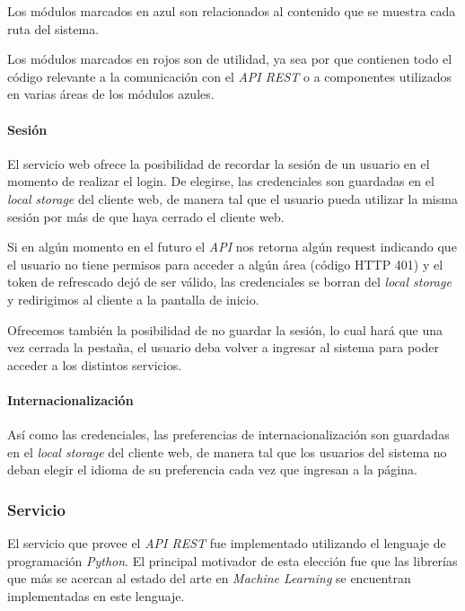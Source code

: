 \documentclass[12pt,a4paper,]{scrartcl}
\let\oldparagraph\paragraph
\renewcommand{\paragraph}[1]{\oldparagraph{#1}\mbox{}}
\begin{document}
Los módulos marcados en azul son relacionados al contenido que se muestra cada ruta del sistema.

Los módulos marcados en rojos son de utilidad, ya sea por que contienen todo el código relevante a la comunicación con el \emph{API REST} o a componentes utilizados en varias áreas de los módulos azules.

\hypertarget{sesiuxf3n}{%
\paragraph{Sesión}\label{sesiuxf3n}}

El servicio web ofrece la posibilidad de recordar la sesión de un usuario en el momento de realizar el login. De elegirse, las credenciales son guardadas en el \emph{local storage} del cliente web, de manera tal que el usuario pueda utilizar la misma sesión por más de que haya cerrado el cliente web.

Si en algún momento en el futuro el \emph{API} nos retorna algún request indicando que el usuario no tiene permisos para acceder a algún área (código HTTP 401) y el token de refrescado dejó de ser válido, las credenciales se borran del \emph{local storage} y redirigimos al cliente a la pantalla de inicio.

Ofrecemos también la posibilidad de no guardar la sesión, lo cual hará que una vez cerrada la pestaña, el usuario deba volver a ingresar al sistema para poder acceder a los distintos servicios.

\hypertarget{internacionalizaciuxf3n}{%
\paragraph{Internacionalización}\label{internacionalizaciuxf3n}}

Así como las credenciales, las preferencias de internacionalización son guardadas en el \emph{local storage} del cliente web, de manera tal que los usuarios del sistema no deban elegir el idioma de su preferencia cada vez que ingresan a la página.

\hypertarget{servicio-1}{%
\subsubsection{Servicio}\label{servicio-1}}

El servicio que provee el \emph{API REST} fue implementado utilizando el lenguaje de programación \emph{Python}. El principal motivador de esta elección fue que las librerías que más se acercan al estado del arte en \emph{Machine Learning} se encuentran implementadas en este lenguaje.
\end{document}
